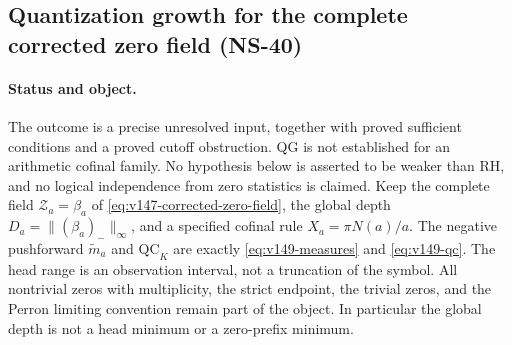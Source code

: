 \subsection*{Quantization growth for the complete corrected zero field (NS-40)}
\label{ns40-sec-qg}

\paragraph{Status and object.}
The outcome is a precise unresolved input, together with proved sufficient
conditions and a proved cutoff obstruction. QG is not established for an
arithmetic cofinal family. No hypothesis below is asserted to be weaker
than RH, and no logical independence from zero statistics is claimed.
Keep the complete field $\mathcal Z_a=\beta_a$ of
\eqref{eq:v147-corrected-zero-field}, the global depth
$D_a=\|(\beta_a)_-\|_\infty$, and a specified cofinal rule
$X_a=\pi N(a)/a$. The negative pushforward $\widetilde m_a$ and
$\mathrm{QC}_K$ are exactly \eqref{eq:v149-measures} and
\eqref{eq:v149-qc}. The head range is an observation interval, not a
truncation of the symbol. All nontrivial zeros with multiplicity, the
strict endpoint, the trivial zeros, and the Perron limiting convention
remain part of the object. In particular the global depth is not a
head minimum or a zero-prefix minimum.


